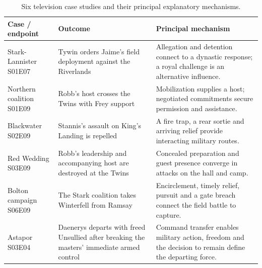 \documentclass{svproc}
\newcommand{\ep}[1]{\textup{#1}}
\begin{document}
\begin{table}[htbp]
\caption{Six television case studies and their principal explanatory mechanisms.}\label{tab:cases}
\centering\small
\begin{tabular}{@{}>{\raggedright\arraybackslash}p{.19\linewidth}>{\raggedright\arraybackslash}p{.37\linewidth}>{\raggedright\arraybackslash}p{.38\linewidth}@{}}
\toprule
Case / endpoint & Outcome & Principal mechanism \\
\midrule
Stark-Lannister \newline \ep{S01E07} & Tywin orders Jaime's field deployment against the Riverlands & Allegation and detention connect to a dynastic response; a royal challenge is an alternative influence. \\
Northern coalition \newline \ep{S01E09} & Robb's host crosses the Twins with Frey support & Mobilization supplies a host; negotiated commitments secure permission and assistance. \\
Blackwater \newline \ep{S02E09} & Stannis's assault on King's Landing is repelled & A fire trap, a rear sortie and arriving relief provide interacting military routes. \\
Red Wedding \newline \ep{S03E09} & Robb's leadership and accompanying host are destroyed at the Twins & Concealed preparation and guest presence converge in attacks on the hall and camp. \\
Bolton campaign \newline \ep{S06E09} & The Stark coalition takes Winterfell from Ramsay & Encirclement, timely relief, pursuit and a gate breach connect the field battle to capture. \\
Astapor \newline \ep{S03E04} & Daenerys departs with freed Unsullied after breaking the masters' immediate armed control & Command transfer enables military action, freedom and the decision to remain define the departing force. \\
\bottomrule
\end{tabular}
\end{table}
\end{document}
